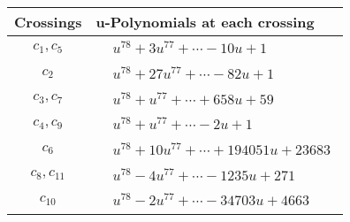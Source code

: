 \documentclass[1p]{elsarticle_modified}
\theoremstyle{definition}
\begin{document}
\begin{tabular}{m{50pt}|m{274pt}}
Crossings & \hspace{64pt}u-Polynomials at each crossing \\
\hline $$\begin{aligned}c_{1},c_{5}\end{aligned}$$&$\begin{aligned}
&u^{78}+3 u^{77}+\cdots-10 u+1
\end{aligned}$\\
\hline $$\begin{aligned}c_{2}\end{aligned}$$&$\begin{aligned}
&u^{78}+27 u^{77}+\cdots-82 u+1
\end{aligned}$\\
\hline $$\begin{aligned}c_{3},c_{7}\end{aligned}$$&$\begin{aligned}
&u^{78}+u^{77}+\cdots+658 u+59
\end{aligned}$\\
\hline $$\begin{aligned}c_{4},c_{9}\end{aligned}$$&$\begin{aligned}
&u^{78}+u^{77}+\cdots-2 u+1
\end{aligned}$\\
\hline $$\begin{aligned}c_{6}\end{aligned}$$&$\begin{aligned}
&u^{78}+10 u^{77}+\cdots+194051 u+23683
\end{aligned}$\\
\hline $$\begin{aligned}c_{8},c_{11}\end{aligned}$$&$\begin{aligned}
&u^{78}-4 u^{77}+\cdots-1235 u+271
\end{aligned}$\\
\hline $$\begin{aligned}c_{10}\end{aligned}$$&$\begin{aligned}
&u^{78}-2 u^{77}+\cdots-34703 u+4663
\end{aligned}$\\
\hline
\end{tabular}\\~\\
\newpage\renewcommand{\arraystretch}{1}
\end{document}
